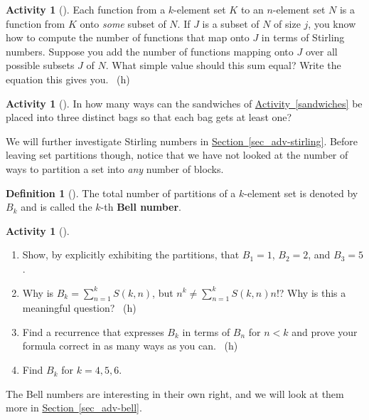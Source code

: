 \documentclass[10pt,]{book}
\newcommand{\terminology}[1]{\textbf{#1}}
\theoremstyle{plain}
\theoremstyle{definition}
\newtheorem{definition}[theorem]{Definition}
\theoremstyle{definition}
\theoremstyle{definition}
\newtheorem{activity}[project]{Activity}
\numberwithin{equation}{chapter}
\newcommand{\lt}{<}
\begin{document}
\begin{activity}[]\label{Stirlingfalling}
\hypertarget{p-1101}{}%
Each function from a \(k\)-element set \(K\) to an \(n\)-element set \(N\) is a function from \(K\) onto \emph{some} subset of \(N\). If \(J\) is a subset of \(N\) of size \(j\), you know how to compute the number of functions that map onto \(J\) in terms of Stirling numbers. Suppose you add the number of functions mapping onto \(J\) over all possible subsets \(J\) of \(N\). What simple value should this sum equal? Write the equation this gives you.%
~{\tiny (h)}\end{activity}
\begin{activity}[]\label{activity-198}
\hypertarget{p-1104}{}%
In how many ways can the sandwiches of \hyperref[sandwiches]{Activity~\ref{sandwiches}} be placed into three distinct bags so that each bag gets at least one?%
\end{activity}
\hypertarget{p-1106}{}%
We will further investigate Stirling numbers in \hyperref[sec_adv-stirling]{Section~\ref{sec_adv-stirling}}.  Before leaving set partitions though, notice that we have not looked at the number of ways to partition a set into \emph{any} number of blocks.%
\begin{definition}[{}]\label{def-bell}
\hypertarget{p-1107}{}%
The total number of partitions of a \(k\)-element set is denoted by \(B_k\) and is called the \(k\)-th \terminology{Bell number}.%
\end{definition}
\begin{activity}[]\label{BellNumberIntro}
\leavevmode%
\begin{enumerate}[font=\bfseries,label=(\alph*),ref=\alph*]
\item\label{task-213} \hypertarget{p-1108}{}%
Show, by explicitly exhibiting the partitions, that \(B_1 = 1\), \(B_2 = 2\), and \(B_3 = 5\).%
\item\label{task-214} \hypertarget{p-1110}{}%
Why is \(B_k = \sum_{n=1}^{k} S(k,n)\), but \(n^k \ne \sum_{n=1}^k S(k,n)n!\)?  Why is this a meaningful question?%
~{\tiny (h)}\item\label{task-215} \hypertarget{p-1112}{}%
Find a recurrence that expresses \(B_k\) in terms of \(B_n\) for \(n\lt  k\) and prove your formula correct in as many ways as you can.%
~{\tiny (h)}\item\label{task-216} \hypertarget{p-1116}{}%
Find \(B_k\) for \(k=4,5,6\).%
\end{enumerate}
\end{activity}
\hypertarget{p-1118}{}%
The Bell numbers are interesting in their own right, and we will look at them more in \hyperref[sec_adv-bell]{Section~\ref{sec_adv-bell}}.%
\typeout{************************************************}
\typeout{************************************************}
\end{document}
